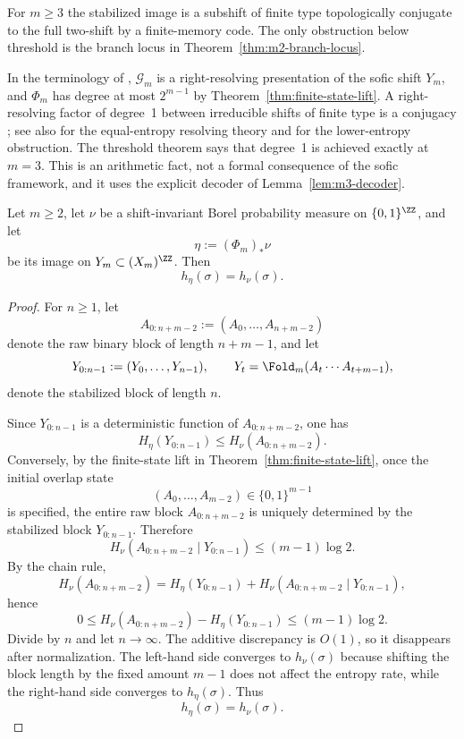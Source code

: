 \begin{remark}\label{rem:exact-recoding}
For $m\ge3$ the stabilized image is a subshift of finite type topologically
conjugate to the full two-shift by a finite-memory code. The only obstruction
below threshold is the branch locus in Theorem~\ref{thm:m2-branch-locus}.
\end{remark}

\begin{remark}\label{rem:sofic-comparison}
In the terminology of \cite{LindMarcus1995}, $\mathcal G_m$ is a
right-resolving presentation of the sofic shift $Y_m$, and $\Phi_m$ has degree
at most $2^{m-1}$ by Theorem~\ref{thm:finite-state-lift}. A right-resolving
factor of degree~1 between irreducible shifts of finite type is a conjugacy
\cite[Theorem~8.1.16]{LindMarcus1995}; see also \cite{Ashley1991} for the
equal-entropy resolving theory and \cite{Boyle1983} for the lower-entropy
obstruction. The threshold theorem says that degree~1 is achieved exactly at
$m=3$. This is an arithmetic fact, not a formal consequence of the sofic
framework, and it uses the explicit decoder of Lemma~\ref{lem:m3-decoder}.
\end{remark}

\begin{proposition}\label{prop:measure-entropy-preservation}
Let $m\ge 2$, let $\nu$ be a shift-invariant Borel probability measure on
$\{0,1\}^{\ZZ}$, and let
\[
\eta:=(\Phi_m)_*\nu
\]
be its image on $Y_m\subset (X_m)^{\ZZ}$. Then
\[
h_\eta(\sigma)=h_\nu(\sigma).
\]
\end{proposition}

\begin{proof}
For $n\ge 1$, let
\[
A_{0:n+m-2}:=(A_0,\dots,A_{n+m-2})
\]
denote the raw binary block of length $n+m-1$, and let
\[
Y_{0:n-1}:=(Y_0,\dots,Y_{n-1}),\qquad
Y_t=\Fold_m(A_t\cdots A_{t+m-1}),
\]
denote the stabilized block of length $n$.

Since $Y_{0:n-1}$ is a deterministic function of $A_{0:n+m-2}$, one has
\[
H_\eta(Y_{0:n-1})\le H_\nu(A_{0:n+m-2}).
\]
Conversely, by the finite-state lift in Theorem~\ref{thm:finite-state-lift},
once the initial overlap state
\[
(A_0,\dots,A_{m-2})\in\{0,1\}^{m-1}
\]
is specified, the entire raw block $A_{0:n+m-2}$ is uniquely determined by the
stabilized block $Y_{0:n-1}$. Therefore
\[
H_\nu(A_{0:n+m-2}\mid Y_{0:n-1})\le (m-1)\log 2.
\]
By the chain rule,
\[
H_\nu(A_{0:n+m-2})
=
H_\eta(Y_{0:n-1})
+
H_\nu(A_{0:n+m-2}\mid Y_{0:n-1}),
\]
hence
\[
0\le H_\nu(A_{0:n+m-2})-H_\eta(Y_{0:n-1})\le (m-1)\log 2.
\]
Divide by $n$ and let $n\to\infty$. The additive discrepancy is $O(1)$, so it
disappears after normalization. The left-hand side converges to
$h_\nu(\sigma)$ because shifting the block length by the fixed amount $m-1$
does not affect the entropy rate, while the right-hand side converges to
$h_\eta(\sigma)$. Thus
\[
h_\eta(\sigma)=h_\nu(\sigma).
\]
\end{proof}

